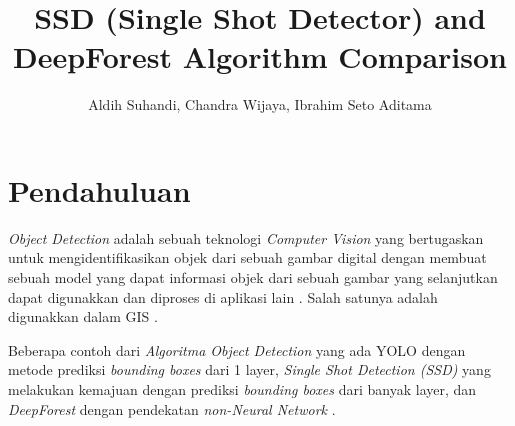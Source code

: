 \documentclass[a4paper]{article}
\begin{document}
\linespread{1.5}

\title{SSD (Single Shot Detector) and DeepForest Algorithm Comparison}
\author{Aldih Suhandi, Chandra Wijaya, Ibrahim Seto Aditama}

\maketitle

\newpage

\tableofcontents
\newpage

\section*{Pendahuluan}

\textit{Object Detection} adalah sebuah teknologi \textit{Computer Vision} yang bertugaskan untuk mengidentifikasikan objek dari sebuah gambar digital dengan membuat sebuah model yang dapat informasi objek dari sebuah gambar yang selanjutkan dapat digunakkan dan diproses di aplikasi lain \autocite{zou2019object}. Salah satunya adalah digunakkan dalam GIS \autocite{arcgis-pro-ssd}. 

Beberapa contoh dari \textit{Algoritma Object Detection} yang ada YOLO dengan metode prediksi \textit{bounding boxes} dari 1 layer, \textit{Single Shot Detection (SSD)} yang melakukan kemajuan dengan prediksi \textit{bounding boxes} dari banyak layer, dan \textit{DeepForest} dengan pendekatan \textit{non-Neural Network} \autocite{8569683, zhou2019deep}. 


\newpage
\end{document}
